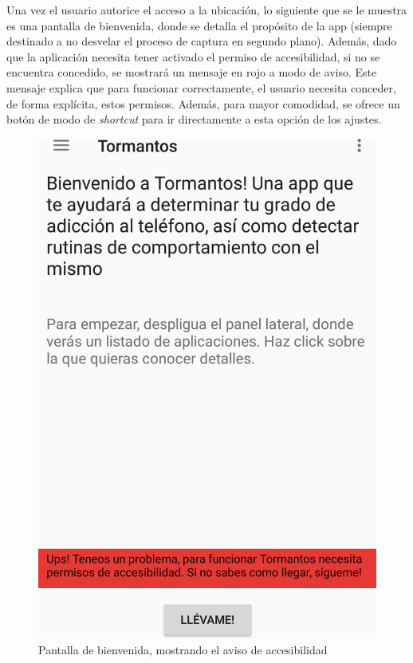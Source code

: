 \documentclass[12pt,a4paper,oneside]{book} %
\begin{document}
Una vez el usuario autorice el acceso a la ubicación, lo siguiente que se le muestra es una pantalla de bienvenida, donde se detalla el propósito de la app (siempre destinado a no desvelar el proceso de captura en segundo plano). Además, dado que la aplicación necesita tener activado el permiso de accesibilidad, si no se encuentra concedido, se mostrará un mensaje en rojo a modo de aviso. Este mensaje explica que para funcionar correctamente, el usuario necesita conceder, de forma explícita, estos permisos. 
\newline \newline 
Además, para mayor comodidad, se ofrece un botón de modo de \textit{shortcut} para ir directamente a esta opción de los ajustes. 
\begin{figure}[H]
	\begin{center}
     	\includegraphics[scale=0.2]{pictures/capsapp/home1.png}
	    	\caption{Pantalla de bienvenida, mostrando el aviso de accesibilidad}
    	\label{fig:Pantalla de bienvenida, mostrando el aviso de accesibilidad}
	\end{center}
\end{figure}
\end{document}
